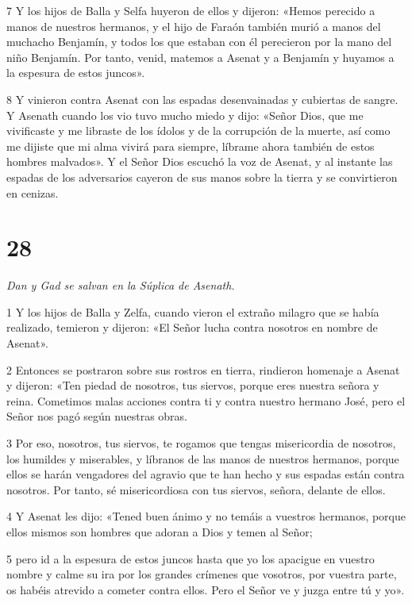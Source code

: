 \par 7 Y los hijos de Balla y Selfa huyeron de ellos y dijeron: «Hemos perecido a manos de nuestros hermanos, y el hijo de Faraón también murió a manos del muchacho Benjamín, y todos los que estaban con él perecieron por la mano del niño Benjamín. Por tanto, venid, matemos a Asenat y a Benjamín y huyamos a la espesura de estos juncos».

\par 8 Y vinieron contra Asenat con las espadas desenvainadas y cubiertas de sangre. Y Asenath cuando los vio tuvo mucho miedo y dijo: «Señor Dios, que me vivificaste y me libraste de los ídolos y de la corrupción de la muerte, así como me dijiste que mi alma vivirá para siempre, líbrame ahora también de estos hombres malvados». Y el Señor Dios escuchó la voz de Asenat, y al instante las espadas de los adversarios cayeron de sus manos sobre la tierra y se convirtieron en cenizas.

\chapter{28}

\par \textit{Dan y Gad se salvan en la Súplica de Asenath.}


\par 1 Y los hijos de Balla y Zelfa, cuando vieron el extraño milagro que se había realizado, temieron y dijeron: «El Señor lucha contra nosotros en nombre de Asenat».

\par 2 Entonces se postraron sobre sus rostros en tierra, rindieron homenaje a Asenat y dijeron: «Ten piedad de nosotros, tus siervos, porque eres nuestra señora y reina. Cometimos malas acciones contra ti y contra nuestro hermano José, pero el Señor nos pagó según nuestras obras.

\par 3 Por eso, nosotros, tus siervos, te rogamos que tengas misericordia de nosotros, los humildes y miserables, y líbranos de las manos de nuestros hermanos, porque ellos se harán vengadores del agravio que te han hecho y sus espadas están contra nosotros. Por tanto, sé misericordiosa con tus siervos, señora, delante de ellos.

\par 4 Y Asenat les dijo: «Tened buen ánimo y no temáis a vuestros hermanos, porque ellos mismos son hombres que adoran a Dios y temen al Señor;

\par 5 pero id a la espesura de estos juncos hasta que yo los apacigue en vuestro nombre y calme su ira por los grandes crímenes que vosotros, por vuestra parte, os habéis atrevido a cometer contra ellos. Pero el Señor ve y juzga entre tú y yo».

